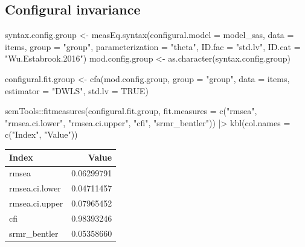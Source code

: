 \documentclass[
  letterpaper,
  DIV=11,
  numbers=noendperiod]{scrreprt}
\newenvironment{Shaded}{\begin{snugshade}}{\end{snugshade}}
\newcommand{\AttributeTok}[1]{\textcolor[rgb]{0.40,0.45,0.13}{#1}}
\newcommand{\ConstantTok}[1]{\textcolor[rgb]{0.56,0.35,0.01}{#1}}
\newcommand{\FunctionTok}[1]{\textcolor[rgb]{0.28,0.35,0.67}{#1}}
\newcommand{\NormalTok}[1]{\textcolor[rgb]{0.00,0.23,0.31}{#1}}
\newcommand{\OtherTok}[1]{\textcolor[rgb]{0.00,0.23,0.31}{#1}}
\newcommand{\SpecialCharTok}[1]{\textcolor[rgb]{0.37,0.37,0.37}{#1}}
\newcommand{\StringTok}[1]{\textcolor[rgb]{0.13,0.47,0.30}{#1}}
\begin{document}
\hypertarget{configural-invariance-1}{%
\subsection{Configural invariance}\label{configural-invariance-1}}

\begin{Shaded}
\begin{Highlighting}[]
\NormalTok{syntax.config.group }\OtherTok{\textless{}{-}} \FunctionTok{measEq.syntax}\NormalTok{(}\AttributeTok{configural.model =}\NormalTok{ model\_sas,}
                               \AttributeTok{data =}\NormalTok{ items,}
                               \AttributeTok{group =} \StringTok{"group"}\NormalTok{,}
                               \AttributeTok{parameterization =} \StringTok{"theta"}\NormalTok{,}
                               \AttributeTok{ID.fac =} \StringTok{"std.lv"}\NormalTok{, }\AttributeTok{ID.cat =} \StringTok{"Wu.Estabrook.2016"}\NormalTok{)}
\NormalTok{mod.config.group }\OtherTok{\textless{}{-}} \FunctionTok{as.character}\NormalTok{(syntax.config.group)}

\NormalTok{configural.fit.group }\OtherTok{\textless{}{-}} \FunctionTok{cfa}\NormalTok{(mod.config.group, }
                           \AttributeTok{group =} \StringTok{"group"}\NormalTok{,}
                           \AttributeTok{data =}\NormalTok{ items,}
                           \AttributeTok{estimator =} \StringTok{"DWLS"}\NormalTok{,}
                           \AttributeTok{std.lv =} \ConstantTok{TRUE}\NormalTok{)}

\NormalTok{semTools}\SpecialCharTok{::}\FunctionTok{fitmeasures}\NormalTok{(configural.fit.group, }\AttributeTok{fit.measures =} \FunctionTok{c}\NormalTok{(}\StringTok{"rmsea"}\NormalTok{, }\StringTok{"rmsea.ci.lower"}\NormalTok{, }\StringTok{"rmsea.ci.upper"}\NormalTok{, }\StringTok{"cfi"}\NormalTok{, }\StringTok{"srmr\_bentler"}\NormalTok{)) }\SpecialCharTok{|\textgreater{}} 
  \FunctionTok{kbl}\NormalTok{(}\AttributeTok{col.names =} \FunctionTok{c}\NormalTok{(}\StringTok{"Index"}\NormalTok{, }\StringTok{"Value"}\NormalTok{))}
\end{Highlighting}
\end{Shaded}

\begin{tabular}[t]{l|r}
\hline
Index & Value\\
\hline
rmsea & 0.06299791\\
\hline
rmsea.ci.lower & 0.04711457\\
\hline
rmsea.ci.upper & 0.07965452\\
\hline
cfi & 0.98393246\\
\hline
srmr\_bentler & 0.05358660\\
\hline
\end{tabular}
\end{document}
